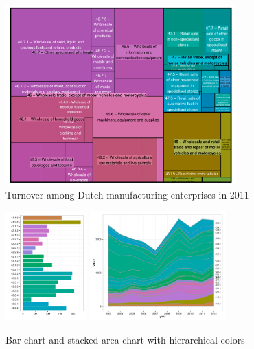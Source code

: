 \documentclass[journal]{vgtc}                %
\begin{document}
\begin{figure}[htb]
  \centering
  \includegraphics[width=3.5in]{TMbusiness.pdf}

  \caption{Turnover among Dutch manufacturing enterprises in 2011}\label{fig:treemapApp}

\end{figure}



\begin{figure}[htb]
  \centering
  \includegraphics[width=1.235in]{bar_chart.pdf}
  \includegraphics[width=2.065in]{stackedarea_chart.pdf}
  \caption{Bar chart and stacked area chart with hierarchical colors}\label{fig:charts}
\end{figure}

\end{document}
